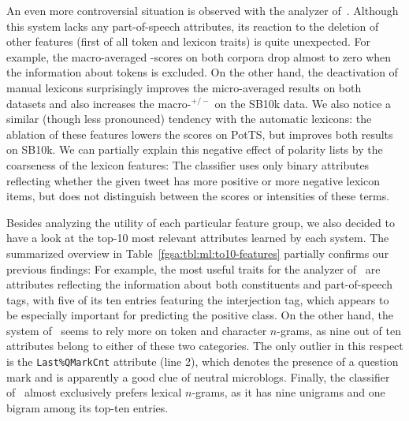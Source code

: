 An even more controversial situation is observed with the analyzer
of~\citet{Guenther:14}. Although this system lacks any part-of-speech
attributes, its reaction to the deletion of other features (first of
all token and lexicon traits) is quite unexpected.  For example, the
macro-averaged \F{}-scores on both corpora drop almost to zero when
the information about tokens is excluded.  On the other hand, the
deactivation of manual lexicons surprisingly improves the
micro-averaged results on both datasets and also increases the
macro-\F{}$^{+/-}$ on the SB10k data.  We also notice a similar
(though less pronounced) tendency with the automatic lexicons: the
ablation of these features lowers the scores on PotTS, but improves
both results on SB10k.  We can partially explain this negative effect
of polarity lists by the coarseness of the lexicon features: The
classifier uses only binary attributes reflecting whether the given
tweet has more positive or more negative lexicon items, but does not
distinguish between the scores or intensities of these terms.

Besides analyzing the utility of each particular feature group, we
also decided to have a look at the top-10 most relevant attributes
learned by each system.  The summarized overview in
Table~\ref{fgsa:tbl:ml:to10-features} partially confirms our previous
findings: For example, the most useful traits for the analyzer
of~\citet{Gamon:04} are attributes reflecting the information about
both constituents and part-of-speech tags, with five of its ten
entries featuring the interjection tag, which appears to be especially
important for predicting the positive class.  On the other hand, the
system of~\citet{Mohammad:13} seems to rely more on token and
character $n$-grams, as nine out of ten attributes belong to either of
these two categories. The only outlier in this respect is the
\texttt{Last\%QMarkCnt} attribute (line 2), which denotes the presence
of a question mark and is apparently a good clue of neutral
microblogs.  Finally, the classifier of~\citet{Guenther:14} almost
exclusively prefers lexical $n$-grams, as it has nine unigrams and one
bigram among its top-ten entries.

